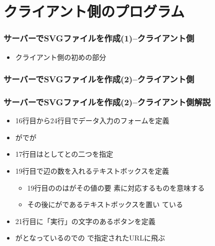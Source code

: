 

\frame{\maketitle}
\section{クライアント側のプログラム}
\begin{frame}[containsverbatim]
 \frametitle{サーバーでSVGファイルを作成(1)--クライアント側}
\begin{itemize}
 \item クライアント側の初めの部分
\end{itemize} 
\end{frame}
\begin{frame}[containsverbatim]
 \frametitle{サーバーでSVGファイルを作成(2)--クライアント側}
\end{frame}
\begin{frame}[containsverbatim]
 \frametitle{サーバーでSVGファイルを作成(2)--クライアント側解説}
 \begin{itemize}
	\item 16行目から24行目でデータ入力のフォームを定義
	\item {}がでが
	\item 17行目はとしてとの二つを指定
	\item 19行目で辺の数を入れるテキストボックスを定義
				\begin{itemize}
				 \item 19行目ののはがその値の要
							 素に対応するものを意味する
				 \item その後にがであるテキストボックスを置い
							 ている
				\end{itemize}
	\item 21行目に「実行」の文字のあるボタンを定義
	\item {}がとなっているのでの
				で指定されたURLに飛ぶ
 \end{itemize}
\end{frame}
